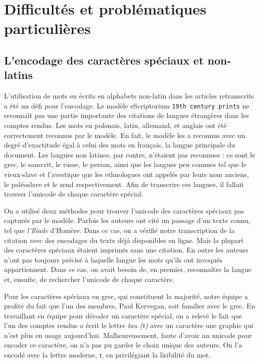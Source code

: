 \documentclass{article}
\begin{document}
	
	\section{Difficultés et problématiques particulières}
	
	
	
	\subsection{L'encodage des caractères spéciaux et non-latins}
	
	L'utilisation de mots en écrits en alphabets non-latin dans les articles retranscrits a été un défi pour l’encodage. Le modèle eScriptorium \texttt{19th century prints} ne reconnaît pas une partie importante des citations de langues étrangères dans les comptes rendus. Les mots en polonais, latin, allemand, et anglais ont été correctement reconnus par le modèle. En fait, le modèle les a reconnus avec un degré d’exactitude égal à celui des mots en français, la langue principale du document. Les langues non latines, par contre, n’étaient pas reconnues : ce sont le grec, le sanscrit, le russe, le persan, ainsi que les langues peu connues tel que le vieux-slave et l’avestique que les ethnologues ont appelés par leurs nom anciens, le paléoslave et le zend respectivement. Afin de transcrire ces langues, il fallait trouver l’unicode de chaque caractère spécial.
	
	On a utilisé deux méthodes pour trouver l’unicode des caractères spéciaux pas capturés par le modèle. Parfois les auteurs ont cité un passage d’un texte connu, tel que \textit{l’Iliade} d'Homère. Dans ce cas, on a vérifié notre transcription de la citation avec des encodages du texte déjà disponibles en ligne. Mais la plupart des caractères spéciaux étaient imprimés sans une citation. En outre les auteurs n’ont pas toujours précisé à laquelle langue les mots qu’ils ont invoqués appartiennent. Dans ce cas, on avait besoin de, en premier, reconnaître la langue et, ensuite, de rechercher l’unicode de chaque caractère.
	
	Pour les caractères spéciaux en grec, qui constituent la majorité, notre équipe a profité du fait que l'un des membres, Paul Kervegan, soit familier avec le grec. En travaillant en équipe pour décoder un caractère spécial, on a relevé le fait que l’un des comptes rendus a écrit le lettre \textit{tau (τ)} avec un caractère une graphie qui n'est plus en usage aujourd'hui. Malheureusement, faute d'avoir un unicode pour encoder ce caractère, on n’a pas pu garder le choix unique des auteurs. On l’a encodé avec la lettre moderne, \textit{τ}, en privilégiant la lisibilité du mot.
	
\end{document}
